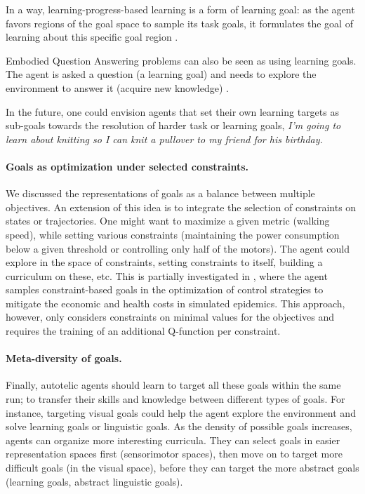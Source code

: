 In a way, learning-progress-based learning is a form of learning goal: as the agent favors regions of the goal space to sample its task goals, it formulates the goal of learning about this specific goal region \cite{baranes2013active,fournier2018accuracy,fournier2019clic,curious,blaes2019control,akakzia2020decstr}.

Embodied Question Answering problems can also be seen as using learning goals. The agent is asked a question (\ie a learning goal) and needs to explore the environment to answer it (acquire new knowledge) \cite{das2018embodied,Yuan_2019}. 

In the future, one could envision agents that set their own learning targets as sub-goals towards the resolution of harder task or learning goals, \eg \textit{I'm going to learn about knitting so I can knit a pullover to my friend for his birthday.}

\paragraph{Goals as optimization under selected constraints.}
We discussed the representations of goals as a balance between multiple objectives. An extension of this idea is to integrate the selection of constraints on states or trajectories. One might want to maximize a given metric (\eg walking speed), while setting various constraints (\eg maintaining the power consumption below a given threshold or controlling only half of the motors). The agent could explore in the space of constraints, setting constraints to itself, building a curriculum on these, etc. This is partially investigated in \cite{colas2020epidemioptim}, where the agent samples constraint-based goals in the optimization of control strategies to mitigate the economic and health costs in simulated epidemics. This approach, however, only considers constraints on minimal values for the objectives and requires the training of an additional Q-function per constraint.

\paragraph{Meta-diversity of goals.} Finally, autotelic agents should learn to target all these goals within the same run; to transfer their skills and knowledge between different types of goals. For instance, targeting visual goals could help the agent explore the environment and solve learning goals or linguistic goals. As the density of possible goals increases, agents can organize more interesting curricula. They can select goals in easier representation spaces first (\eg sensorimotor spaces), then move on to target more difficult goals (\eg in the visual space), before they can target the more abstract goals (\eg learning goals, abstract linguistic goals). 

